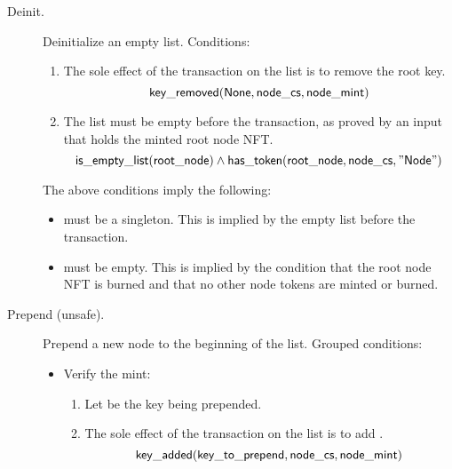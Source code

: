 \documentclass[../midgard.tex]{subfiles}
\begin{document}
\begin{description}
        \initSpendingValidatorWarning
    \item[Deinit.] Deinitialize an empty list.
      Conditions:
        \begin{enumerate}
            \item The sole effect of the transaction on the list is to remove the root key.
                \begin{equation*}
                    \mathsf{key\_removed}(\mathsf{None}, \mathsf{node\_cs}, \mathsf{node\_mint})
                \end{equation*}
            
            \item The list must be empty before the transaction, as proved by an input  that holds the minted root node NFT.
                \begin{equation*}
                    \mathsf{is\_empty\_list}(\mathsf{root\_node}) \land
                    \mathsf{has\_token}(\mathsf{root\_node}, \mathsf{node\_cs}, \mathsf{"Node"})
                \end{equation*}
        \end{enumerate}
        The above conditions imply the following:
        \begin{itemize}
            \item {} must be a singleton.
              This is implied by the empty list before the transaction.
            \item {} must be empty.
              This is implied by the condition that the root node NFT is burned and that no other node tokens are minted or burned.
        \end{itemize}

    \item[Prepend (unsafe).] Prepend a new node to the beginning of the list.
      Grouped conditions:
        \begin{itemize}
            \item Verify the mint: 
            \begin{enumerate}
                \item Let  be the key being prepended.
                \item The sole effect of the transaction on the list is to add .
                    \begin{equation*}
                        \mathsf{key\_added}(\mathsf{key\_to\_prepend}, \mathsf{node\_cs}, \mathsf{node\_mint})
                    \end{equation*}
            \end{enumerate}
            

\end{itemize}
\end{description}
\end{document}
